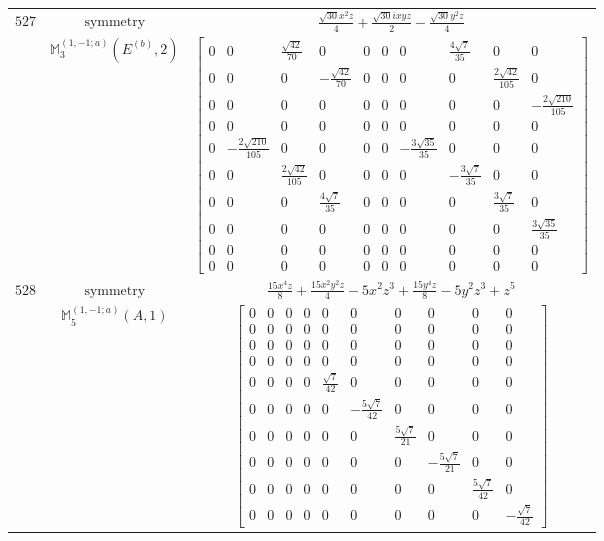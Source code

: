 \documentclass[fleqn,8pt,landscape]{jsarticle}
\begin{document}
\begin{longtable}{ccc}
$ 527 $ & $ \text{symmetry} $ & $ \frac{\sqrt{30} x^{2} z}{4} + \frac{\sqrt{30} i x y z}{2} - \frac{\sqrt{30} y^{2} z}{4} $ \\
$  $ & $ \mathbb{M}_{3}^{(1,-1;a)}(E^{(b)},2) $ & $ \begin{bmatrix} 0 & 0 & \frac{\sqrt{42}}{70} & 0 & 0 & 0 & 0 & \frac{4 \sqrt{7}}{35} & 0 & 0 \\ 0 & 0 & 0 & - \frac{\sqrt{42}}{70} & 0 & 0 & 0 & 0 & \frac{2 \sqrt{42}}{105} & 0 \\ 0 & 0 & 0 & 0 & 0 & 0 & 0 & 0 & 0 & - \frac{2 \sqrt{210}}{105} \\ 0 & 0 & 0 & 0 & 0 & 0 & 0 & 0 & 0 & 0 \\ 0 & - \frac{2 \sqrt{210}}{105} & 0 & 0 & 0 & 0 & - \frac{3 \sqrt{35}}{35} & 0 & 0 & 0 \\ 0 & 0 & \frac{2 \sqrt{42}}{105} & 0 & 0 & 0 & 0 & - \frac{3 \sqrt{7}}{35} & 0 & 0 \\ 0 & 0 & 0 & \frac{4 \sqrt{7}}{35} & 0 & 0 & 0 & 0 & \frac{3 \sqrt{7}}{35} & 0 \\ 0 & 0 & 0 & 0 & 0 & 0 & 0 & 0 & 0 & \frac{3 \sqrt{35}}{35} \\ 0 & 0 & 0 & 0 & 0 & 0 & 0 & 0 & 0 & 0 \\ 0 & 0 & 0 & 0 & 0 & 0 & 0 & 0 & 0 & 0 \end{bmatrix} $ \\ \hline
$ 528 $ & $ \text{symmetry} $ & $ \frac{15 x^{4} z}{8} + \frac{15 x^{2} y^{2} z}{4} - 5 x^{2} z^{3} + \frac{15 y^{4} z}{8} - 5 y^{2} z^{3} + z^{5} $ \\
$  $ & $ \mathbb{M}_{5}^{(1,-1;a)}(A,1) $ & $ \begin{bmatrix} 0 & 0 & 0 & 0 & 0 & 0 & 0 & 0 & 0 & 0 \\ 0 & 0 & 0 & 0 & 0 & 0 & 0 & 0 & 0 & 0 \\ 0 & 0 & 0 & 0 & 0 & 0 & 0 & 0 & 0 & 0 \\ 0 & 0 & 0 & 0 & 0 & 0 & 0 & 0 & 0 & 0 \\ 0 & 0 & 0 & 0 & \frac{\sqrt{7}}{42} & 0 & 0 & 0 & 0 & 0 \\ 0 & 0 & 0 & 0 & 0 & - \frac{5 \sqrt{7}}{42} & 0 & 0 & 0 & 0 \\ 0 & 0 & 0 & 0 & 0 & 0 & \frac{5 \sqrt{7}}{21} & 0 & 0 & 0 \\ 0 & 0 & 0 & 0 & 0 & 0 & 0 & - \frac{5 \sqrt{7}}{21} & 0 & 0 \\ 0 & 0 & 0 & 0 & 0 & 0 & 0 & 0 & \frac{5 \sqrt{7}}{42} & 0 \\ 0 & 0 & 0 & 0 & 0 & 0 & 0 & 0 & 0 & - \frac{\sqrt{7}}{42} \end{bmatrix} $ \\ \hline

\end{longtable}
\end{document}

